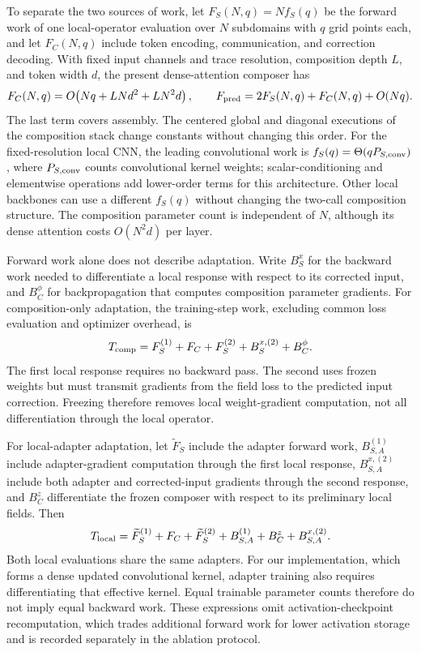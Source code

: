 To separate the two sources of work, let $F_S(N,q)=Nf_S(q)$ be the forward
work of one local-operator evaluation over $N$ subdomains with $q$ grid points
each, and let $F_C(N,q)$ include token encoding, communication, and correction
decoding. With fixed input channels and trace resolution, composition depth
$L$, and token width $d$, the present dense-attention composer has
\begin{equation}
 F_C(N,q)=O\!\left(Nq+LNd^2+LN^2d\right),\qquad
 F_{\rm pred}=2F_S(N,q)+F_C(N,q)+O(Nq).
 \label{eq:composition-forward-cost}
\end{equation}
The last term covers assembly. The centered global and diagonal executions
of the composition stack change constants without changing this order. For
the fixed-resolution local CNN, the leading convolutional work is
$f_S(q)=\Theta(qP_{S,\rm conv})$, where $P_{S,\rm conv}$ counts convolutional
kernel weights; scalar-conditioning and elementwise operations add lower-order
terms for this architecture. Other local backbones can use a different
$f_S(q)$ without changing the two-call composition structure. The composition
parameter count is independent of $N$, although its dense attention costs
$O(N^2d)$ per layer.

Forward work alone does not describe adaptation. Write $B_S^x$ for the
backward work needed to differentiate a local response with respect to its
corrected input, and $B_C^\phi$ for backpropagation that computes composition
parameter gradients. For composition-only adaptation, the training-step work,
excluding common loss evaluation and optimizer overhead, is
\begin{equation}
 T_{\rm comp}=F_S^{(1)}+F_C+F_S^{(2)}
              +B_S^{x,(2)}+B_C^\phi.
 \label{eq:composition-training-cost}
\end{equation}
The first local response requires no backward pass. The second uses frozen
weights but must transmit gradients from the field loss to the predicted
input correction. Freezing therefore removes local weight-gradient
computation, not all differentiation through the local operator.

For local-adapter adaptation, let $\widetilde F_S$ include the adapter forward
work, $B_{S,A}^{(1)}$ include adapter-gradient computation through the first
local response, $B_{S,A}^{x,(2)}$ include both adapter and corrected-input
gradients through the second response, and $B_C^z$ differentiate the frozen
composer with respect to its preliminary local fields. Then
\begin{equation}
 T_{\rm local}=\widetilde F_S^{(1)}+F_C+\widetilde F_S^{(2)}
                +B_{S,A}^{(1)}+B_C^z+B_{S,A}^{x,(2)}.
 \label{eq:local-adapter-training-cost}
\end{equation}
Both local evaluations share the same adapters. For our implementation,
which forms a dense updated convolutional kernel, adapter training also
requires differentiating that effective kernel. Equal trainable parameter
counts therefore do not imply equal backward work. These expressions omit
activation-checkpoint recomputation, which trades additional forward work
for lower activation storage and is recorded separately in the ablation
protocol.

